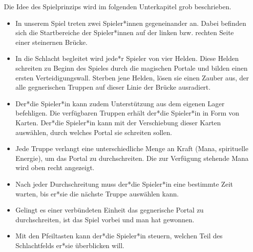 Die Idee des Spielprinzips wird im folgenden Unterkapitel grob beschrieben.\
\begin{itemize}
    \item In unserem Spiel treten zwei Spieler*innen gegeneinander an. Dabei befinden sich die Startbereiche der Spieler*innen auf der linken bzw. rechten Seite einer steinernen Brücke.
    \item In die Schlacht begleitet wird jede*r Spieler von vier Helden. Diese Helden schreiten zu Beginn des Spieles durch die magischen Portale und bilden einen ersten Verteidigungswall.
    Sterben jene Helden, lösen sie einen Zauber aus, der alle gegnerischen Truppen auf dieser Linie der Brücke ausradiert.
    \item Der*die Spieler*in kann zudem Unterstützung aus dem eigenen Lager befehligen. Die verfügbaren Truppen erhält der*die Spieler*in in Form von Karten. Der*die Spieler*in kann mit der Verschiebung dieser Karten auswählen, durch welches Portal sie schreiten sollen.
    \item Jede Truppe verlangt eine unterschiedliche Menge an Kraft (Mana, spirituelle Energie), um das Portal zu durchschreiten. Die zur Verfügung stehende Mana wird oben recht angezeigt.
    \item Nach jeder Durchschreitung muss der*die Spieler*in eine bestimmte Zeit warten, bis er*sie die nächste Truppe auswählen kann.
    \item Gelingt es einer verbündeten Einheit das gegnerische Portal zu durchschreiten, ist das Spiel vorbei und man hat gewonnen. 
    \item Mit den Pfeiltasten kann der*die Spieler*in steuern, welchen Teil des Schlachtfelds er*sie überblicken will.
\end{itemize}



